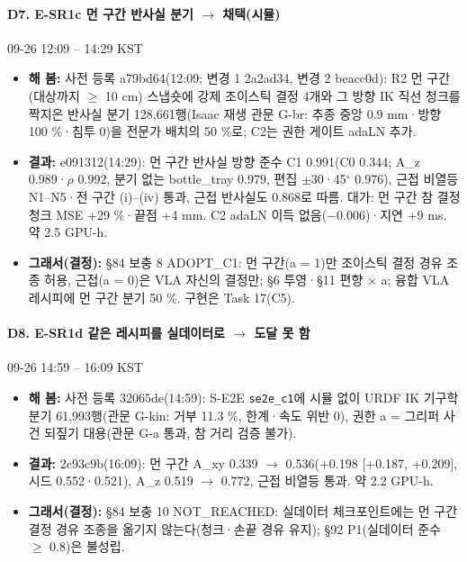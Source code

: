 \paragraph{D7. E-SR1c 먼 구간 반사실 분기 $\rightarrow$ 채택(시뮬)}
{\small 09-26 12:09 -- 14:29 KST}
\begin{itemize}
  \item \textbf{해 봄:} 사전 등록 a79bd64(12:09; 변경 1 2a2ad34, 변경 2 beacc0d): R2 먼 구간(대상까지 $\geq$ 10 cm) 스냅숏에 강제 조이스틱 결정 4개와 그 방향 IK 직선 청크를 짝지은 반사실 분기 128,661행(Isaac 재생 관문 G-br: 추종 중앙 0.9 mm·방향 100 \%·침투 0)을 전문가 배치의 50 \%로; C2는 권한 게이트 adaLN 추가.
  \item \textbf{결과:} e091312(14:29): 먼 구간 반사실 방향 준수 C1 0.991(C0 0.344; A\_z 0.989·$\rho$ 0.992, 분기 없는 bottle\_tray 0.979, 편집 $\pm$30·45$^\circ$ 0.976), 근접 비열등 N1--N5·전 구간 (i)--(iv) 통과, 근접 반사실도 0.868로 따름. 대가: 먼 구간 참 결정 청크 MSE +29 \%·끝점 +4 mm. C2 adaLN 이득 없음($-$0.006)·지연 +9 ms. 약 2.5 GPU-h.
  \item \textbf{그래서(결정):} §84 보충 8 ADOPT\_C1: 먼 구간(a = 1)만 조이스틱 결정 경유 조종 허용, 근접(a = 0)은 VLA 자신의 결정만; §6 투영·§11 편향 $\times$ a; 융합 VLA 레시피에 먼 구간 분기 50 \%. 구현은 Task 17(C5).
\end{itemize}

\paragraph{D8. E-SR1d 같은 레시피를 실데이터로 $\rightarrow$ 도달 못 함}
{\small 09-26 14:59 -- 16:09 KST}
\begin{itemize}
  \item \textbf{해 봄:} 사전 등록 32065de(14:59): S-E2E \texttt{se2e\_\allowbreak{}c1}에 시뮬 없이 URDF IK 기구학 분기 61,993행(관문 G-kin: 거부 11.3 \%, 한계·속도 위반 0), 권한 a = 그리퍼 사건 되짚기 대용(관문 G-a 통과, 참 거리 검증 불가).
  \item \textbf{결과:} 2c93c9b(16:09): 먼 구간 A\_xy 0.339 $\rightarrow$ 0.536(+0.198 [+0.187, +0.209], 시드 0.552·0.521), A\_z 0.519 $\rightarrow$ 0.772, 근접 비열등 통과. 약 2.2 GPU-h.
  \item \textbf{그래서(결정):} §84 보충 10 NOT\_REACHED: 실데이터 체크포인트에는 먼 구간 결정 경유 조종을 옮기지 않는다(청크·손끝 경유 유지); §92 P1(실데이터 준수 $\geq$ 0.8)은 불성립.
\end{itemize}

